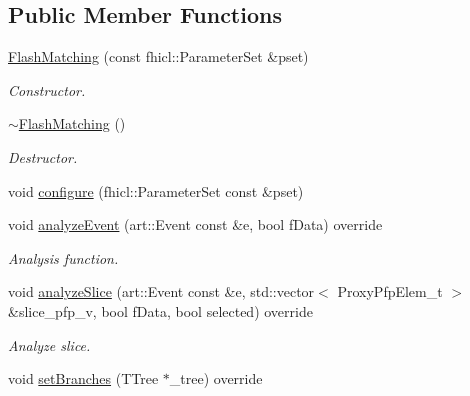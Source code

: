 \subsection*{Public Member Functions}
\begin{DoxyCompactItemize}
\item 
\hyperlink{classanalysis_1_1FlashMatching_a00eb9eca115b63fe442d1a14fb205692}{Flash\+Matching} (const fhicl\+::\+Parameter\+Set \&pset)
\begin{DoxyCompactList}\small\item\em Constructor. \end{DoxyCompactList}\item 
\hyperlink{classanalysis_1_1FlashMatching_ab2647643c3420bac36afe949ac252f20}{$\sim$\+Flash\+Matching} ()\hypertarget{classanalysis_1_1FlashMatching_ab2647643c3420bac36afe949ac252f20}{}\label{classanalysis_1_1FlashMatching_ab2647643c3420bac36afe949ac252f20}

\begin{DoxyCompactList}\small\item\em Destructor. \end{DoxyCompactList}\item 
void \hyperlink{classanalysis_1_1FlashMatching_a313d8dd41d24540555aaf27e87579626}{configure} (fhicl\+::\+Parameter\+Set const \&pset)
\item 
void \hyperlink{classanalysis_1_1FlashMatching_ab3bc034486cadaeda1c4c0868a7f17f1}{analyze\+Event} (art\+::\+Event const \&e, bool f\+Data) override\hypertarget{classanalysis_1_1FlashMatching_ab3bc034486cadaeda1c4c0868a7f17f1}{}\label{classanalysis_1_1FlashMatching_ab3bc034486cadaeda1c4c0868a7f17f1}

\begin{DoxyCompactList}\small\item\em Analysis function. \end{DoxyCompactList}\item 
void \hyperlink{classanalysis_1_1FlashMatching_acdff3053951979de66145a37a41f1767}{analyze\+Slice} (art\+::\+Event const \&e, std\+::vector$<$ Proxy\+Pfp\+Elem\+\_\+t $>$ \&slice\+\_\+pfp\+\_\+v, bool f\+Data, bool selected) override
\begin{DoxyCompactList}\small\item\em Analyze slice. \end{DoxyCompactList}\item 
void \hyperlink{classanalysis_1_1FlashMatching_a40570b8e39ad953ba6acccbe5c466c49}{set\+Branches} (T\+Tree $\ast$\+\_\+tree) override\hypertarget{classanalysis_1_1FlashMatching_a40570b8e39ad953ba6acccbe5c466c49}{}\label{classanalysis_1_1FlashMatching_a40570b8e39ad953ba6acccbe5c466c49}


\end{DoxyCompactItemize}
